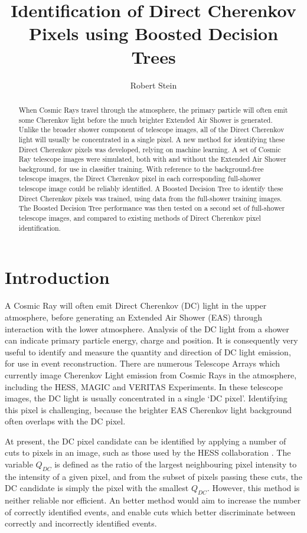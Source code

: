\documentclass[]{article}
\title{Identification of Direct Cherenkov Pixels using Boosted Decision Trees}
\author{Robert Stein}
\begin{document}
\maketitle

\begin{abstract}
When Cosmic Rays travel through the atmosphere, the primary particle will often emit some Cherenkov light before the much brighter Extended Air Shower is generated. Unlike the broader shower component of telescope images, all of the Direct Cherenkov light will usually be concentrated in a single pixel. A new method for identifying these Direct Cherenkov pixels was developed, relying on machine learning. A set of Cosmic Ray telescope images were simulated, both with and without the Extended Air Shower background, for use in classifier training. With reference to the background-free telescope images, the Direct Cherenkov pixel in each corresponding full-shower telescope image could be reliably identified. A Boosted Decision Tree to identify these Direct Cherenkov pixels was trained, using data from the full-shower training images. The Boosted Decision Tree performance was then tested on a second set of full-shower telescope images, and compared to existing methods of Direct Cherenkov pixel identification.
\end{abstract}

\section{Introduction}
A Cosmic Ray will often emit Direct Cherenkov (DC) light in the upper atmosphere, before generating an Extended Air Shower (EAS) through interaction with the lower atmosphere. Analysis of the DC light from a shower can indicate primary particle energy, charge and position. It is consequently very useful to identify and measure the quantity and direction of DC light emission, for use in event reconstruction. There are numerous Telescope Arrays which currently image Cherenkov Light emission from Cosmic Rays in the atmosphere, including the HESS, MAGIC and VERITAS Experiments. In these telescope images, the DC light is usually concentrated in a single  \textquoteleft DC pixel'. Identifying this pixel is challenging, because the brighter EAS Cherenkov light background often overlaps with the DC pixel. 

At present, the DC pixel candidate can be identified by applying a number of cuts to pixels in an image, such as those used by the HESS collaboration \cite{hess07}. The variable $Q_{DC}$ is defined as the ratio of the largest neighbouring pixel intensity to the intensity of a given pixel, and from the subset of pixels passing these cuts, the DC candidate is simply the pixel with the smallest $Q_{DC}$. However, this method is neither reliable nor efficient. An better method would aim to increase the number of correctly identified events, and enable cuts which better discriminate between correctly and incorrectly identified events.
\end{document}
